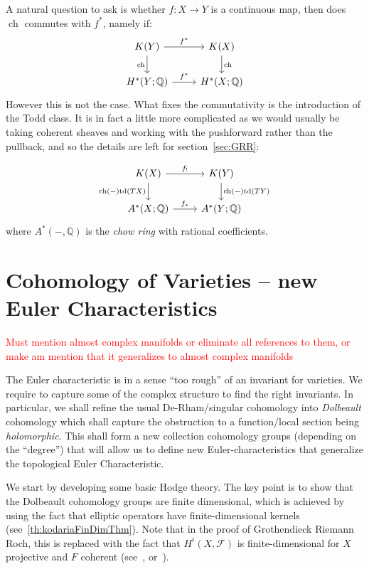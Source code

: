 \documentclass{book}
\newcommand{\Q}{{\mathbb{Q}}}
\newcommand{\CF}{{\mathcal{F}}}
\newcommand{\ch}{{\operatorname{ch}}}
\newcommand{\td}{{\operatorname{td}}}
\begin{document}
A natural question to ask is whether $f: X \to Y$ is a continuous map, then does $\ch$ commutes with $f^*$, namely
if:
\[
\begin{tikzcd}
K(Y) \arrow[r, "f^*"] \arrow[d, "\ch"'] & K(X) \arrow[d, "\ch"] \\
H^*(Y; \Q) \arrow[r, "f^*"]             & H^*(X; \Q)
\end{tikzcd}
\]
However this is not the case. What fixes the commutativity is the introduction of the Todd class. It is in
fact a little more complicated as we would usually be taking coherent sheaves and working with the
pushforward rather than the pullback, and so the details are left for section~\ref{sec:GRR}:

\[
\begin{tikzcd}
K(X) \arrow[r, "f_!"] \arrow[d, "\ch(-)\td(TX)"'] & K(Y) \arrow[d, "\ch(-)\td(TY)"] \\
A^*(X; \Q) \arrow[r, "f_*"]             & A^*(Y; \Q)
\end{tikzcd}
\]
where $A^*(-, \Q)$ is the \emph{chow ring} with rational coefficients.

\chapter{Cohomology of Varieties -- new Euler Characteristics}\label{cha:cohomVarieties}

\textcolor{red}{Must mention almost complex manifolds or eliminate all references to them, or make am mention
that it generalizes to almost complex manifolds}

The Euler characteristic is in a sense ``too rough'' of an invariant for varieties. We require to capture some
of the complex structure to find the right invariants. In particular, we shall refine the usual
De-Rham/singular cohomology into \emph{Dolbeault} cohomology which shall capture the obstruction to
a function/local section being \emph{holomorphic}. This shall form a new collection cohomology groups (depending on
the ``degree'') that will allow us to define new Euler-characteristics that generalize the topological Euler
Characteristic.

We start by developing some basic Hodge theory. The key point is to show that the Dolbeault cohomology groups
are finite dimensional, which is achieved by using the fact that elliptic operators have finite-dimensional
kernels (see~\cref{th:kodariaFinDimThm}). Note that in the proof of Grothendieck Riemann Roch, this is replaced
with the fact that $H^i(X, \CF)$ is finite-dimensional for $X$ projective and $F$ coherent
(see~\cite{NateAlgGeo}, or~\cite{hartshorneAlgebraicGeometry2013}).
\end{document}
